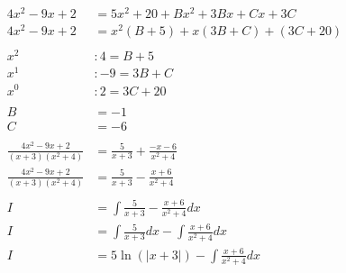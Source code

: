 \documentclass[12pt]{article}
\begin{document}
\begin{align}
    4x^2-9x+2                      & = 5x^2 + 20 + Bx^2 + 3Bx + Cx + 3C                                                        \\
    4x^2-9x+2                      & = x^2(B + 5) + x(3B + C) + (3C + 20)                                                      \\
    \nonumber                                                                                                                  \\
    x^2                            & : 4 = B + 5                                                                               \\
    x^1                            & : -9 = 3B + C                                                                             \\
    x^0                            & : 2 = 3C + 20                                                                             \\
    \nonumber                                                                                                                  \\
    B                              & = -1                                                                                      \\
    C                              & = -6                                                                                      \\
    \nonumber                                                                                                                  \\
    \frac{4x^2-9x+2}{(x+3)(x^2+4)} & = \frac{5}{x+3} + \frac{-x - 6}{x^2+4}                                                    \\
    \frac{4x^2-9x+2}{(x+3)(x^2+4)} & = \frac{5}{x+3} - \frac{x + 6}{x^2+4}                                                     \\
    \nonumber                                                                                                                  \\
    I                              & = \int \frac{5}{x+3} - \frac{x + 6}{x^2+4} dx                                             \\
    I                              & = \int \frac{5}{x+3} dx - \int \frac{x + 6}{x^2+4} dx                                     \\
    I                              & = 5\ln(|x+3|) - \int \frac{x + 6}{x^2+4} dx                                               \\

\end{align}
\end{document}
